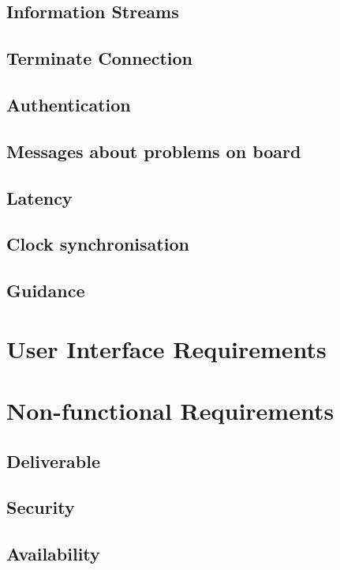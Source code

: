 \subsection{Information Streams}

\subsection{Terminate Connection}

\subsection{Authentication}

\subsection{Messages about problems on board}

\subsection{Latency}

\subsection{Clock synchronisation}

\subsection{Guidance}

\section{User Interface Requirements}\label{sec:ui-requirements}

\section{Non-functional Requirements}\label{sec:non-func-requirements}

\subsection{Deliverable}

\subsection{Security}

\subsection{Availability}
